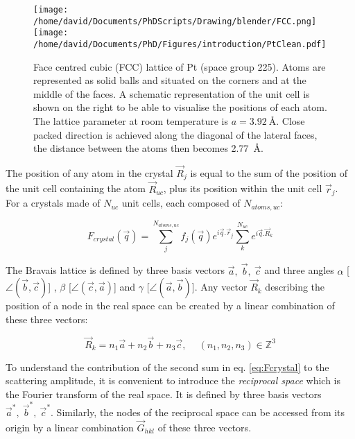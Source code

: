 \begin{figure}[!htb]
    \centering
    \texttt{[image: /home/david/Documents/PhDScripts/Drawing/blender/FCC.png]}
    \texttt{[image: /home/david/Documents/PhD/Figures/introduction/PtClean.pdf]}
    \caption{
    Face centred cubic (FCC) lattice of Pt (space group 225).
    Atoms are represented as solid balls and situated on the corners and at the middle of the faces.
    A schematic representation of the unit cell is shown on the right to be able to visualise the positions of each atom.
    The lattice parameter at room temperature is $a = \qty{3.92}{\angstrom}$.
    Close packed direction is achieved along the diagonal of the lateral faces, the distance between the atoms then becomes \qty{2.77}{\angstrom}.
    }
    \label{fig:fcc}
\end{figure}

The position of any atom in the crystal $\vec{R}_j$ is equal to the sum of the position of the unit cell containing the atom $\vec{R}_{uc}$, plus its position within the unit cell $\vec{r}_j$.
For a crystals made of $N_{uc}$ unit cells, each composed of $N_{atoms,uc}$:

\begin{equation}
    F_{crystal}(\vec{q}) = \sum_j^{N_{atoms,uc}} f_j(\vec{q}) e^{i\vec{q}.\vec{r}_j} \sum_k^{N_{uc}} e^{i\vec{q}.\vec{R}_k}
    \label{eq:Fcrystal}
\end{equation}

The Bravais lattice is defined by three basis vectors $\vec{a},\ \vec{b},\ \vec{c}$ and three angles $\alpha$ [$\angle (\vec{b}, \vec{c})$] , $\beta$ [$\angle (\vec{c}, \vec{a})$] and $\gamma$ [$\angle (\vec{a}, \vec{b})$].
Any vector $\vec{R}_k$ describing the position of a node in the real space can be created by a linear combination of these three vectors:

\begin{equation}
    \label{eq:R_k}
    \vec{R}_k=n_1\vec{a} + n_2\vec{b} + n_3\vec{c}, \quad \ (n_1,n_2,n_3) \in \mathbb{Z}^3
\end{equation}

To understand the contribution of the second sum in eq. \ref{eq:Fcrystal} to the scattering amplitude, it is convenient to introduce the \textit{reciprocal space} which is the Fourier transform of the real space.
It is defined by three basis vectors $\vec{a}^*,\ \vec{b}^*,\ \vec{c}^*$.
Similarly, the nodes of the reciprocal space can be accessed from its origin by a linear combination $\vec{G}_{hkl}$ of these three vectors.

